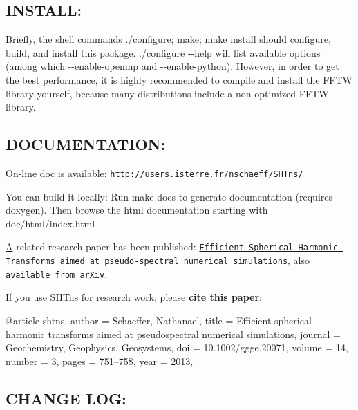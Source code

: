 \subsection*{I\+N\+S\+T\+A\+L\+L\+: }

Briefly, the shell commands {\ttfamily ./configure; make; make install} should configure, build, and install this package. {\ttfamily ./configure -\/-\/help} will list available options (among which {\ttfamily -\/-\/enable-\/openmp} and {\ttfamily -\/-\/enable-\/python}). However, in order to get the best performance, it is highly recommended to compile and install the F\+F\+T\+W library yourself, because many distributions include a non-\/optimized F\+F\+T\+W library.

\subsection*{D\+O\+C\+U\+M\+E\+N\+T\+A\+T\+I\+O\+N\+: }


\begin{DoxyItemize}
\item On-\/line doc is available\+: \href{http://users.isterre.fr/nschaeff/SHTns/}{\tt http\+://users.\+isterre.\+fr/nschaeff/\+S\+H\+Tns/}
\item You can build it locally\+: Run {\ttfamily make docs} to generate documentation (requires doxygen). Then browse the html documentation starting with {\ttfamily doc/html/index.\+html}
\item \hyperlink{structA}{A} related research paper has been published\+: \href{http://dx.doi.org/10.1002/ggge.20071}{\tt Efficient Spherical Harmonic Transforms aimed at pseudo-\/spectral numerical simulations}, also \href{http://arxiv.org/abs/1202.6522}{\tt available from ar\+Xiv}.
\item If you use S\+H\+Tns for research work, please {\bfseries cite this paper}\+: \begin{DoxyVerb}  @article {shtns,
    author = {Schaeffer, Nathanael},
    title = {Efficient spherical harmonic transforms aimed at
    pseudospectral numerical simulations},
    journal = {Geochemistry, Geophysics, Geosystems},
    doi = {10.1002/ggge.20071},
    volume = {14}, number = {3}, pages = {751--758},
    year = {2013},
  }
\end{DoxyVerb}

\end{DoxyItemize}

\subsection*{C\+H\+A\+N\+G\+E L\+O\+G\+: }



